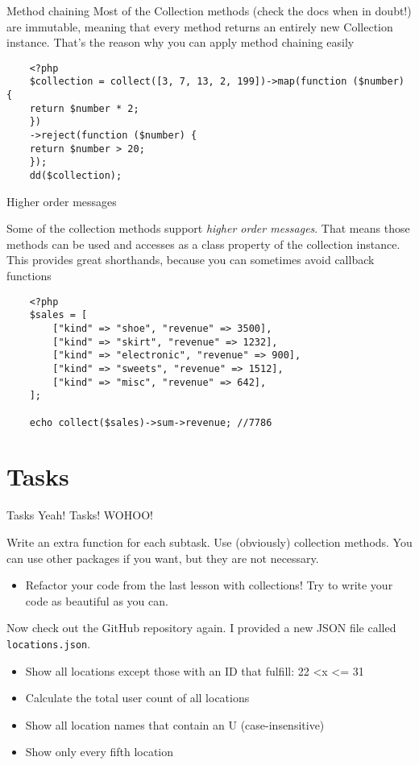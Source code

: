 \begin{frame}[fragile]{Method chaining}
	Most of the Collection methods (check the docs when in doubt!) are immutable, meaning that every method returns an entirely new Collection instance. That's the reason why you can apply method chaining easily \pause
	
	\begin{lstlisting}
	<?php
	$collection = collect([3, 7, 13, 2, 199])->map(function ($number) {
	return $number * 2;
	})
	->reject(function ($number) {
	return $number > 20;
	});
	dd($collection);
	\end{lstlisting}
\end{frame}

\begin{frame}[fragile]{Higher order messages}
	
	Some of the collection methods support \textit{higher order messages}. That means those methods can be used and accesses as a class property of the collection instance. This provides great shorthands, because you can sometimes avoid callback functions\pause
	
	\begin{lstlisting}
	<?php
	$sales = [
		["kind" => "shoe", "revenue" => 3500],
		["kind" => "skirt", "revenue" => 1232],
		["kind" => "electronic", "revenue" => 900],
		["kind" => "sweets", "revenue" => 1512],
		["kind" => "misc", "revenue" => 642],
	];

	echo collect($sales)->sum->revenue; //7786
	\end{lstlisting}
\end{frame}

\section{Tasks}

\begin{frame}{Tasks}
	Yeah! Tasks! WOHOO!
	
	Write an extra function for each subtask. Use (obviously) collection methods. You can use other packages if you want, but they are not necessary.\pause 
	\begin{itemize}
		\item Refactor your code from the last lesson with collections! Try to write your code as beautiful as you can. \pause
	\end{itemize}
	Now check out the GitHub repository again. I provided a new JSON file called \texttt{locations.json}. \pause
	\begin{itemize}
		\item Show all locations except those with an ID that fulfill: 22 \textless  x \textless= 31 \pause			
		\item Calculate the total user count of all locations \pause	
		\item Show all location names that contain an U (case-insensitive) \pause
		\item Show only every fifth location \pause
	\end{itemize}
\end{frame}




